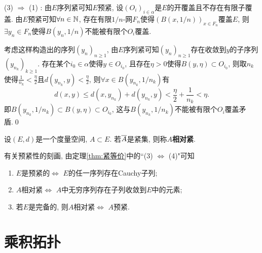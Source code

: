 \begin{Proof}
        (3) $ \Rightarrow $ (1) : 由$ E $序列紧可知$ E $预紧, 设$ (O_i)_{i\in\alpha} $是$ E $的开覆盖且不存在有限子覆盖. 由$ E $预紧可知$ \forall n\in\N $, 存在有限$ 1/n $-网$ F_n $使得$ (B(x,1/n))_{x\in F_n} $覆盖$ E $, 则$ \exists y_n\in F_n $使得$ B(y_n,1/n) $不能被有限个$ O_i $覆盖.

        考虑这样构造出的序列$ (y_n)_{n\geqslant 1} $, 由$ E $序列紧可知$ (y_n)_{n\geqslant 1} $存在收敛到$ y $的子序列$ (y_{n_k})_{k\geqslant 1} $. 存在某个$ i_0\in\alpha $使得$ y\in O_{i_0} $, 且存在$ \eta>0 $使得$ B(y,\eta)\subset O_{i_0} $, 则取$ n_k $使得$ \frac{1}{n_k}<\frac{\eta}{2} $且$ d(y_{n_k},y)<\frac{\eta}{2} $, 则$ \forall x\in B(y_{n_k},1/n_k) $有
        \[
        d(x,y)\leqslant d(x,y_{n_k})+d(y_{n_k},y)<\frac{\eta}{2}+\frac{1}{n_k}<\eta.
        \]
        即$ B(y_{n_k},1/n_k)\subset B(y,\eta)\subset O_{i_0} $, 这与$ B(y_{n_k},1/n_k) $不能被有限个$ O_i $覆盖矛盾.\qed
    \end{Proof}

    \begin{Definition}[相对紧]\label{def:相对紧}
        设$ (E,d) $是一个度量空间, $ A\subset E $. 若$ \baro{A} $是紧集, 则称$ A $\textbf{相对紧}.
    \end{Definition}

    \begin{Remark}\label{rmk:预紧性的刻画}
        有关预紧性的刻画, 由定理\ref{thm:紧等价}中的``(3) $ \Leftrightarrow $ (4)"可知
        \begin{enumerate}[(1)]
            \item $ E $是预紧的$ \Longleftrightarrow $ $ E $的任一序列存在Cauchy子列;

            \item $ A $相对紧$ \Longleftrightarrow $ $ A $中无穷序列存在子列收敛到$ E $中的元素;

            \item 若$ E $是完备的, 则$ A $相对紧$ \Longleftrightarrow $ $ A $预紧.
        \end{enumerate}
    \end{Remark}

\section{乘积拓扑}


